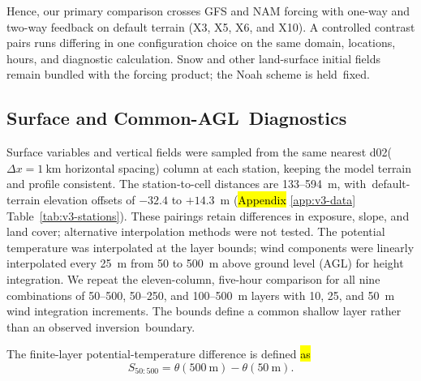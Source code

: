 \documentclass[air,article,accept,moreauthors]{Definitions/mdpi}
\begin{document}
Hence, our primary comparison crosses GFS and NAM forcing with one-way and two-way feedback on default terrain (X3, X5, X6, and X10).
A controlled contrast pairs runs differing in one configuration choice on the same domain, locations, hours, and diagnostic calculation.
Snow and other land-surface initial fields remain bundled with the forcing product; the Noah scheme is held~fixed.

\subsection{Surface and Common-AGL~Diagnostics}
\label{sec:v3-common-agl}

Surface variables and vertical fields were sampled from the same nearest d02\linebreak   ($\Delta x = 1~\text{km}$ horizontal spacing) column at each station, keeping the model terrain and profile consistent.
The station-to-cell distances are 133--594~m, with~default-terrain elevation offsets of $-32.4$ to $+14.3$~m (\hl{Appendix} %
 \ref{app:v3-data} Table~\ref{tab:v3-stations}).
These pairings retain differences in exposure, slope, and land cover; alternative interpolation methods were not tested.
The potential temperature was interpolated at the layer bounds; wind components were linearly interpolated every 25~m from 50 to 500~m above ground level (AGL) for height integration.
We repeat the eleven-column, five-hour comparison for all nine combinations of 50--500, 50--250, and 100--500~m layers with 10, 25, and 50~m wind integration increments.
The bounds define a common shallow layer rather than an observed inversion~boundary.

The finite-layer potential-temperature difference is defined \hl{as} %
\begin{equation}
S_{50:500}=\theta(500~\mathrm{m})-\theta(50~\mathrm{m}).
\end{equation}
\end{document}
